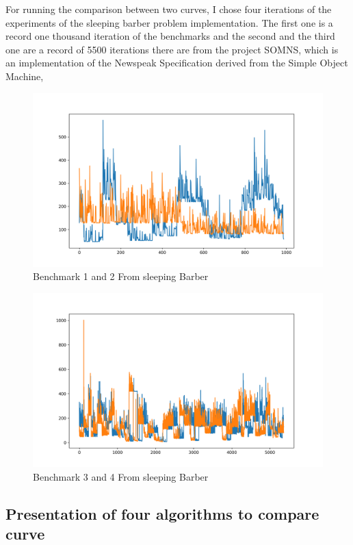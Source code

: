 \documentclass{article}
\begin{document}
For running the comparison between two curves, I chose four iterations of the experiments of the sleeping barber problem implementation. The first one is a record one thousand iteration of the benchmarks and the second and the third one are a record of 5500 iterations there are from the project SOMNS, which is an implementation of the Newspeak Specification derived from the Simple Object Machine,

\begin{figure}[h!]
    \centering
    \includegraphics[width=1\textwidth]{plot_0.png}
    \caption{Benchmark 1 and 2 From sleeping Barber}
    \label{fig:bench_1_2}
\end{figure}


\begin{figure}[h!]
    \centering
    \includegraphics[width=1\textwidth]{plot_1.png}
    \caption{Benchmark 3 and 4 From sleeping Barber}
    \label{fig:bench_2_3}
\end{figure}

\subsection{Presentation of four algorithms to compare curve}
\end{document}
